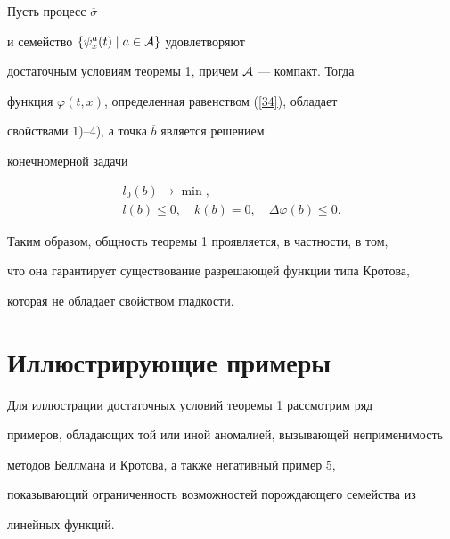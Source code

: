 \begin{cor}


Пусть процесс $\overline{\sigma}$


и семейство $\{\psi_x^a (t)\mid a\in {\cal A}\}$ удовлетворяют


достаточным условиям теоремы 1, причем ${\cal A}$ --- компакт. Тогда


функция $\varphi (t,x)$, определенная равенством (\ref{34}), обладает


свойствами 1)--4), а точка $\overline{b}$ является решением


конечномерной задачи


\begin{gather*}


l_0 (b)\rightarrow\min, \\


%


l(b)\leq 0,\quad k(b)=0,\quad \Delta \varphi (b)\leq 0.


\end{gather*}


\end{cor}





Таким образом, общность теоремы 1 проявляется, в частности, в том,


что она гарантирует существование разрешающей функции типа Кротова,


которая не обладает свойством гладкости.








\section{Иллюстрирующие примеры}








Для иллюстрации достаточных условий теоремы 1 рассмотрим ряд


примеров, обладающих той или иной аномалией, вызывающей неприменимость


методов Беллмана и Кротова, а также негативный пример 5,


показывающий ограниченность возможностей порождающего семейства из


линейных функций.





